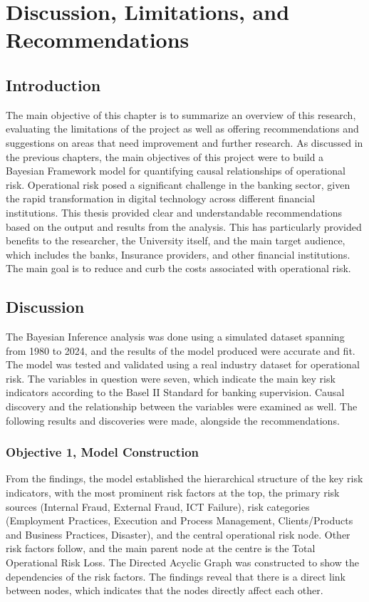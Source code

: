 \chapter{Discussion, Limitations, and Recommendations}
\section{Introduction}
The main objective of this chapter is to summarize an overview of this research, evaluating the limitations of the project as well as offering recommendations and suggestions on areas that need improvement and further research. As discussed in the previous chapters, the main objectives of this project were to build a Bayesian Framework model for quantifying causal relationships of operational risk. Operational risk posed a significant challenge in the banking sector, given the rapid transformation in digital technology across different financial institutions. This thesis provided clear and understandable recommendations based on the output and results from the analysis. This has particularly provided benefits to the researcher, the University itself, and the main target audience, which includes the banks, Insurance providers, and other financial institutions. The main goal is to reduce and curb the costs associated with operational risk. 

\section{Discussion} 
The Bayesian Inference analysis was done using a simulated dataset spanning from 1980 to 2024, and the results of the model produced were accurate and fit. The model was tested and validated using a real industry dataset for operational risk. The variables in question were seven, which indicate the main key risk indicators according to the Basel II Standard for banking supervision. Causal discovery and the relationship between the variables were examined as well. The following results and discoveries were made, alongside the recommendations.
\subsection{Objective 1, Model Construction}
From the findings, the model established the hierarchical structure of the key risk indicators, with the most prominent risk factors at the top, the primary risk sources (Internal Fraud, External Fraud, ICT Failure), risk categories (Employment Practices, Execution and Process Management, Clients/Products and Business Practices, Disaster), and the central operational risk node. Other risk factors follow, and the main parent node at the centre is the Total Operational Risk Loss. The Directed Acyclic Graph was constructed to show the dependencies of the risk factors. The findings reveal that there is a direct link between nodes, which indicates that the nodes directly affect each other. 

